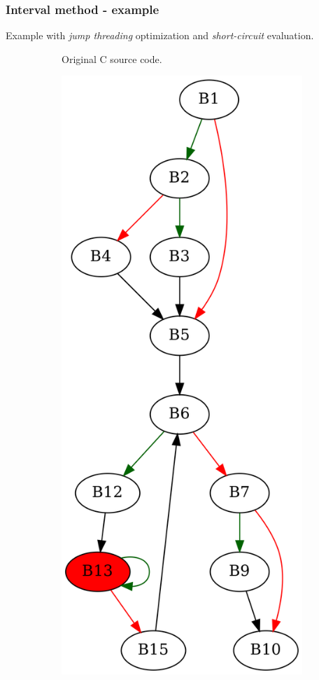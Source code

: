 \documentclass[aspectratio=1610]{beamer}
\begin{document}
\begin{frame}[noframenumbering]
	\frametitle{Interval method - example}
	Example with \textit{jump threading} optimization and \textit{short-circuit} evaluation.
	\begin{figure}[htbp]
		\centering
		\begin{subfigure}[b]{0.30\textwidth}
			\centering
			
			\caption{Original C source code.}
		\end{subfigure}
		\begin{subfigure}[b]{0.50\textwidth}
			\centering
			\includegraphics[height=0.6\paperheight]{inc/methods/interval/example/sample/f_0002b.png}

\end{subfigure}
\end{figure}
\end{frame}
\end{document}
